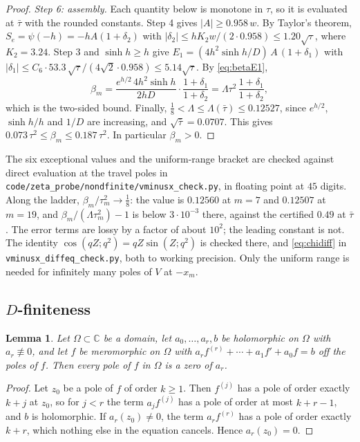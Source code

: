 \documentclass[11pt]{article}
\theoremstyle{plain}
\newtheorem{lemma}[theorem]{Lemma}
\theoremstyle{definition}
\theoremstyle{remark}
\newcommand{\C}{\mathbb{C}}
\theoremstyle{plain}\newtheorem*{maintheorem}{Main Theorem}
\begin{document}
\begin{proof}
\emph{Step 6: assembly.} Each quantity below is monotone in $\tau$, so it is evaluated at $\bar\tau$
with the rounded constants. Step 4 gives $|A|\ge0.958\,w$. By Taylor's theorem,
$S_e=\psi(-h)=-hA(1+\delta_2)$ with $|\delta_2|\le hK_2w/(2\cdot0.958)\le1.20\sqrt\tau$,
where $K_2=3.24$. Step 3 and $\sinh h\ge h$ give $E_1=(4h^2\sinh h/D)\,A\,(1+\delta_1)$ with
$|\delta_1|\le C_6\cdot53.3\,\sqrt\tau/(4\sqrt2\cdot0.958)\le5.14\sqrt\tau$. By
\eqref{eq:betaE1},
\[
   \beta_m=\frac{e^{h/2}\,4h^2\sinh h}{2hD}\cdot\frac{1+\delta_1}{1+\delta_2}
   =\Lambda\tau^2\,\frac{1+\delta_1}{1+\delta_2},
\]
which is the two-sided bound. Finally, $\tfrac18<\Lambda\le\Lambda(\bar\tau)\le0.12527$, since
$e^{h/2}$, $\sinh h/h$ and $1/D$ are increasing, and $\sqrt{\bar\tau}=0.0707$. This gives
$0.073\,\tau^2\le\beta_m\le0.187\,\tau^2$. In particular $\beta_m>0$.
\end{proof}

\noindent The six exceptional values and the uniform-range bracket are checked against direct
evaluation at the travel poles in \texttt{code/zeta\_probe/nondfinite/vminusx\_check.py}, in
floating point at $45$ digits. Along
the ladder, $\beta_m/\tau_m^2\to\tfrac18$: the value is $0.12560$ at $m=7$ and $0.12507$ at $m=19$,
and $\beta_m/(\Lambda\tau_m^2)-1$ is below $3\cdot10^{-3}$ there, against the certified $0.49$ at
$\bar\tau$. The error terms are lossy by a factor of about $10^2$; the leading constant is not. The identity
$\cos(qZ;q^2)=qZ\sin(Z;q^2)$ is checked there, and \eqref{eq:chidiff} in
\texttt{vminusx\_diffeq\_check.py}, both to working precision. Only the
uniform range is needed for infinitely many poles of $V$ at $-x_m$.

\subsection{\texorpdfstring{$D$}{D}-finiteness}

\begin{lemma}\label{lem:odeposes}
Let $\Omega\subset\C$ be a domain, let $a_0,\dots,a_r,b$ be holomorphic on $\Omega$ with
$a_r\not\equiv0$, and let $f$ be meromorphic on $\Omega$ with
$a_rf^{(r)}+\cdots+a_1f'+a_0f=b$ off the poles of $f$. Then every pole of $f$ in $\Omega$ is a zero
of $a_r$.
\end{lemma}

\begin{proof}
Let $z_0$ be a pole of $f$ of order $k\ge1$. Then $f^{(j)}$ has a pole of order exactly $k+j$ at
$z_0$, so for $j<r$ the term $a_jf^{(j)}$ has a pole of order at most $k+r-1$, and $b$ is
holomorphic. If $a_r(z_0)\ne0$, the term $a_rf^{(r)}$ has a pole of order exactly $k+r$, which
nothing else in the equation cancels. Hence $a_r(z_0)=0$.
\end{proof}
\end{document}
